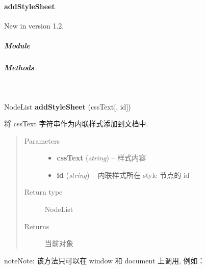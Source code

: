 \documentclass[letterpaper,10pt,english]{sphinxmanual}
\begin{document}
\paragraph{addStyleSheet}
\label{api/core/node/addStyleSheet:addstylesheet}\label{api/core/node/addStyleSheet::doc}New in version 1.2.

\subparagraph{Module}
\label{api/core/node/addStyleSheet:module}\begin{quote}

{\hyperref[api/core/node/index:module-Node]{}}
\end{quote}


\subparagraph{Methods}
\label{api/core/node/addStyleSheet:methods}

\begin{fulllineitems}
\label{api/core/node/addStyleSheet:Node.addStyleSheet}~
\begin{DUlineblock}{0em}
\item[] NodeList \textbf{addStyleSheet} (cssText{[}, id{]})
\item[] 将 cssText 字符串作为内联样式添加到文档中.
\end{DUlineblock}
\begin{quote}\begin{description}
\item[{Parameters}] \leavevmode\begin{itemize}
\item {}
\textbf{cssText} (\emph{string}) -- 样式内容

\item {}
\textbf{id} (\emph{string}) -- 内联样式所在 style 节点的 id

\end{itemize}

\item[{Return type}] \leavevmode
NodeList

\item[{Returns}] \leavevmode
当前对象

\end{description}\end{quote}

\begin{notice}{note}{Note:}
该方法只可以在 window 和 document 上调用, 例如：


\end{notice}
\end{fulllineitems}
\end{document}
